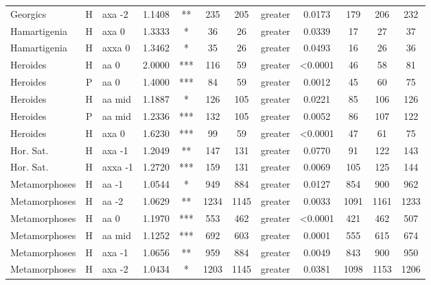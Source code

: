 \documentclass[twocolumn, switch]{article} %
\begin{document}
\begin{table}[h!]
\begin{adjustbox}{totalheight=0.9\textheight}
\begin{tabular}{lclcccclcc@{\hspace{1\tabcolsep}}c@{\hspace{1\tabcolsep}}c}
      Georgics &     H &    axa -2 & 1.1408 &      ** &   235 &   205 &  greater &  0.0173 &      179 &      206 &      232 \\
  Hamartigenia &     H &     axa 0 & 1.3333 &       * &    36 &    26 &  greater &  0.0339 &       17 &       27 &       37 \\
  Hamartigenia &     H &    axxa 0 & 1.3462 &       * &    35 &    26 &  greater &  0.0493 &       16 &       26 &       36 \\
      Heroides &     H &      aa 0 & 2.0000 &     *** &   116 &    59 &  greater &  <0.0001 &       46 &       58 &       81 \\
      Heroides &     P &      aa 0 & 1.4000 &     *** &    84 &    59 &  greater &  0.0012 &       45 &       60 &       75 \\
      Heroides &     H &    aa mid & 1.1887 &       * &   126 &   105 &  greater &  0.0221 &       85 &      106 &      126 \\
      Heroides &     P &    aa mid & 1.2336 &     *** &   132 &   105 &  greater &  0.0052 &       86 &      107 &      122 \\
      Heroides &     H &     axa 0 & 1.6230 &     *** &    99 &    59 &  greater &  <0.0001 &       47 &       61 &       75 \\
     Hor. Sat. &     H &    axa -1 & 1.2049 &      ** &   147 &   131 &  greater &  0.0770 &       91 &      122 &      143 \\
     Hor. Sat. &     H &   axxa -1 & 1.2720 &     *** &   159 &   131 &  greater &  0.0069 &      105 &      125 &      144 \\
 Metamorphoses &     H &     aa -1 & 1.0544 &       * &   949 &   884 &  greater &  0.0127 &      854 &      900 &      962 \\
 Metamorphoses &     H &     aa -2 & 1.0629 &      ** &  1234 &  1145 &  greater &  0.0033 &     1091 &     1161 &     1233 \\
 Metamorphoses &     H &      aa 0 & 1.1970 &     *** &   553 &   462 &  greater &  <0.0001 &      421 &      462 &      507 \\
 Metamorphoses &     H &    aa mid & 1.1252 &     *** &   692 &   603 &  greater &  0.0001 &      555 &      615 &      674 \\
 Metamorphoses &     H &    axa -1 & 1.0656 &      ** &   959 &   884 &  greater &  0.0049 &      843 &      900 &      950 \\
 Metamorphoses &     H &    axa -2 & 1.0434 &       * &  1203 &  1145 &  greater &  0.0381 &     1098 &     1153 &     1206 \\

\end{tabular}
\end{adjustbox}
\end{table}
\end{document}
